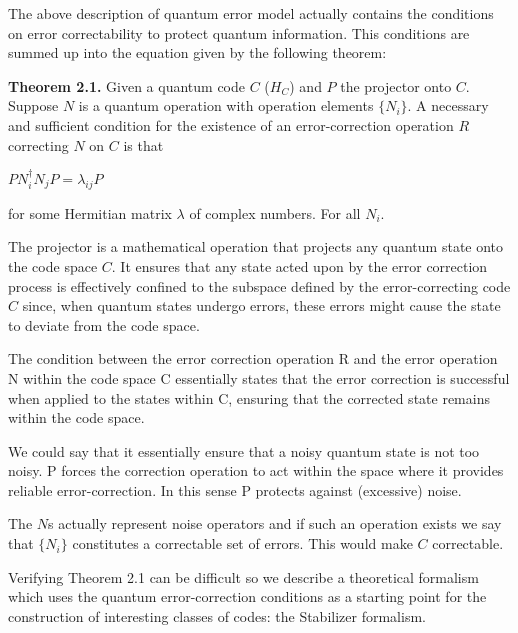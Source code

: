 \documentclass[12pt]{report}
\begin{document}
\begin{minipage}{1 \textwidth}
	    The above description of quantum error model actually contains the conditions on error correctability to protect quantum information. 
	    This conditions are summed up into the equation given by the following theorem: \newline
	    
	    \textbf{Theorem 2.1.} Given a quantum code $C$ ($H_C$) and $P$ the projector onto $C$. Suppose $N$ is a quantum operation with operation elements $\{N_i\}$. A necessary and sufficient condition for the existence of an error-correction operation $R$ correcting $N$ on $C$ is that
	   
	    \begin{center}
	    	$PN_i^{\dagger}N_jP = \lambda_{ij}P$
	    \end{center}
	    
	    for some Hermitian matrix $\lambda$ of complex numbers. For all $N_i$. \newline
	    
	    The projector is a mathematical operation that projects any quantum state onto the code space $C$. It ensures that any state acted upon by the error correction process is effectively confined to the subspace defined by the error-correcting code $C$ since, when quantum states undergo errors, these errors might cause the state to deviate from the code space. 
	    
	    
	    

		
	\end{minipage}
	
	\begin{minipage}{1 \textwidth}
		
		The condition between the error correction operation R and the error operation N within the code space C essentially states that the error correction is successful when applied to the states within C, ensuring that the corrected state remains within the code space.
		
		We could say that it essentially ensure that a noisy quantum state is not too noisy. P forces the correction operation to act within the space where it provides reliable error-correction. In this sense P protects against (excessive) noise.
		
		
		The $N$s actually represent noise operators and if such an operation exists we say that $\{N_i\}$ constitutes a correctable set of errors. This would make $C$ correctable. \newline
		
		Verifying Theorem 2.1 can be difficult so we describe a theoretical formalism which uses the quantum error-correction conditions as a starting point for the construction of interesting classes of codes: the Stabilizer formalism.
		
		
	\end{minipage}
\end{document}
